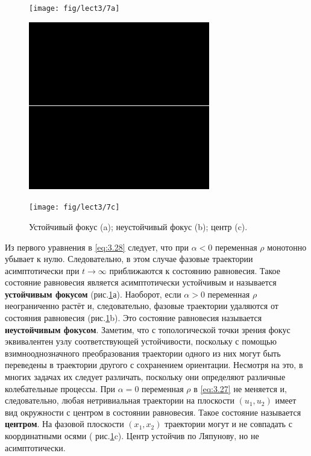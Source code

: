 \begin{figure}[h!]
        \centering
        \begin{minipage}{0.32\linewidth}
                \texttt{[image: fig/lect3/7a]} 
        \end{minipage}
        \begin{minipage}{0.32\linewidth}
               \includegraphics[width=\linewidth]{fig/lect3/7b} 
        \end{minipage}
        \begin{minipage}{0.32\linewidth}
               \texttt{[image: fig/lect3/7c]} 
        \end{minipage}                                
        \label{fig:3.7}
        \caption{Устойчивый фокус (a); неустойчивый фокус (b); центр (c).}
\end{figure}
Из первого уравнения в \eqref{eq:3.28} следует, что при $ \alpha < 0$ переменная $\rho$ монотонно убывает к нулю. Следовательно, в этом случае фазовые траектории асимптотически при $t \to \infty$ приближаются к состоянию равновесия. Такое состояние равновесия является асимптотически устойчивым и называется \textbf{ устойчивым фокусом} (рис.\ref{fig:3.7}а). Наоборот, 
если $ \alpha > 0 $ переменная $\rho$ неограниченно растёт и, следовательно, фазовые траектории удаляются от состояния равновесия (рис.\ref{fig:3.7}b).  Это состояние равновесия называется \textbf{неустойчивым фокусом}.
Заметим, что с топологической точки зрения фокус эквивалентен узлу соответствующей устойчивости, поскольку с помощью взимнооднозначного преобразования траектории одного из них могут быть переведены в траектории другого с сохранением ориентации. Несмотря на это, в многих задачах их следует различать, поскольку они определяют различные колебательные процессы. При $\alpha = 0$ переменная $\rho$ в \eqref{eq:3.27}  не меняется и, следовательно, любая нетривиальная траектории на плоскости $(u_1, u_2)$ имеет вид окружности с центром в состоянии равновесия. Такое состояние называется \textbf{центром}. На фазовой плоскости $(x_1,x_2)$ траектории могут и не совпадать с координатными осями ( рис.\ref{fig:3.7}c). Центр устойчив по Ляпунову, но не асимптотически.

